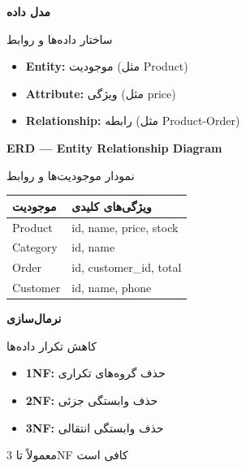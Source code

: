 \documentclass[14pt, a4paper, landscape]{extarticle}
\newcommand{\slide}[1]{%
    \newpage
    \begin{center}
    \begin{minipage}[t]{0.95\textwidth}
    \vspace{0.5cm}
    #1
    \vspace{0.5cm}
    \end{minipage}
    \end{center}
}
\newcommand{\slidetitle}[1]{%
    \begin{center}
        {\LARGE\bfseries\textcolor{primary}{#1}}
    \end{center}
    \vspace{0.5cm}
}
\newcommand{\myaccent}[1]{\textcolor{accent}{#1}}
\begin{document}
\slide{
    \slidetitle{مدل داده}
    \vspace{0.5cm}
    {\large ساختار داده‌ها و روابط}
    \vspace{0.8cm}
    \begin{itemize}[itemsep=0.5em]
        \item \textbf{Entity:} موجودیت (مثل Product)
        \item \textbf{Attribute:} ویژگی (مثل price)
        \item \textbf{Relationship:} رابطه (مثل Product-Order)
    \end{itemize}
}

\slide{
    \slidetitle{ERD — Entity Relationship Diagram}
    \vspace{0.5cm}
    {\large نمودار موجودیت‌ها و روابط}
    \vspace{0.8cm}
    \begin{center}
        \begin{tabular}{ll}
            \toprule
            \textbf{موجودیت} & \textbf{ویژگی‌های کلیدی} \\
            \midrule
            Product & id, name, price, stock \\
            \hline
            Category & id, name \\
            \hline
            Order & id, customer\_id, total \\
            \hline
            Customer & id, name, phone \\
            \bottomrule
        \end{tabular}
    \end{center}
}

\slide{
    \slidetitle{نرمال‌سازی}
    \vspace{0.5cm}
    {\large کاهش تکرار داده‌ها}
    \vspace{0.8cm}
    \begin{itemize}[itemsep=0.5em]
        \item \textbf{1NF:} حذف گروه‌های تکراری
        \item \textbf{2NF:} حذف وابستگی جزئی
        \item \textbf{3NF:} حذف وابستگی انتقالی
    \end{itemize}
    \vspace{0.5cm}
    \begin{center}
        {\myaccent{معمولاً تا 3NF کافی است}}
    \end{center}
}
\end{document}
